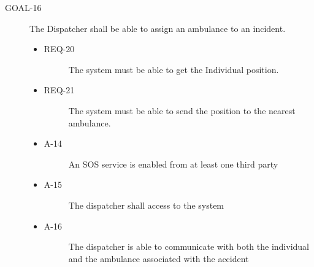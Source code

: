 \documentclass[a4paper]{article}
\newcommand{\requirement}{\ding{229}}%
\begin{document}
         \begin{description}
        	\item[GOAL-16] The Dispatcher shall be able to assign an ambulance to an incident.
            	\begin{itemize}
            	    \item[\requirement]
                	\begin{description}
                	\item[REQ-20] The system must be able to get the Individual position.
                	\end{description}
                	\item[\requirement]
                	\begin{description}
                	\item[REQ-21] The system must be able to send the position to the nearest ambulance.
                	\end{description}
                	\item
                	\begin{description}
                	\item[A-14] An SOS service is enabled from at least one third party
                	\end{description}
                	\item
                	\begin{description}
                	\item[A-15] The dispatcher shall access to the system         \end{description}
                	\item
                	\begin{description}
                	\item[A-16]  The dispatcher is able to communicate with both the individual and the ambulance associated with the accident
                	\end{description}
                	
                	\end{itemize}
        \end{description}
        
\end{document}
